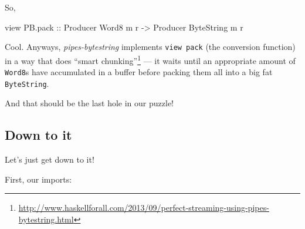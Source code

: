 \documentclass[]{article}
\newenvironment{Shaded}{}{}
\newcommand{\DataTypeTok}[1]{\textcolor[rgb]{0.56,0.13,0.00}{#1}}
\newcommand{\NormalTok}[1]{#1}
\newcommand{\OtherTok}[1]{\textcolor[rgb]{0.00,0.44,0.13}{#1}}
\renewcommand{\href}[2]{#2\footnote{\url{#1}}}
\begin{document}
So,

\begin{Shaded}
\begin{Highlighting}[]
\NormalTok{view PB.pack}\OtherTok{ ::} \DataTypeTok{Producer} \DataTypeTok{Word8}\NormalTok{      m r}
             \OtherTok{{-}\textgreater{}} \DataTypeTok{Producer} \DataTypeTok{ByteString}\NormalTok{ m r}
\end{Highlighting}
\end{Shaded}

Cool. Anyways, \emph{pipes-bytestring} implements \texttt{view\ pack} (the
conversion function) in a way that does
\href{http://www.haskellforall.com/2013/09/perfect-streaming-using-pipes-bytestring.html}{``smart
chunking''} --- it waits until an appropriate amount of \texttt{Word8}s have
accumulated in a buffer before packing them all into a big fat
\texttt{ByteString}.

And that should be the last hole in our puzzle!

\subsection{Down to it}\label{down-to-it}

Let's just get down to it!

First, our imports:
\end{document}
